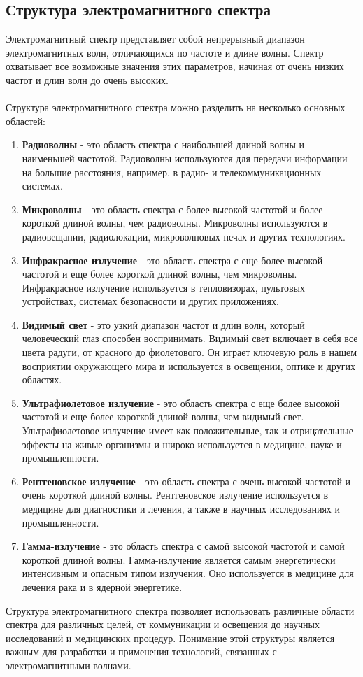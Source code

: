 \documentclass{article}
\begin{document}
\subsection{Структура электромагнитного спектра}
Электромагнитный спектр представляет собой непрерывный диапазон электромагнитных волн, отличающихся по частоте и длине волны. Спектр охватывает все возможные значения этих параметров, начиная от очень низких частот и длин волн до очень высоких.\\
~\\
Структура электромагнитного спектра можно разделить на несколько основных областей:
\begin{enumerate}
\item \textbf{Радиоволны} - это область спектра с наибольшей длиной волны и наименьшей частотой. Радиоволны используются для передачи информации на большие расстояния, например, в радио- и телекоммуникационных системах.
\item \textbf{Микроволны} - это область спектра с более высокой частотой и более короткой длиной волны, чем радиоволны. Микроволны используются в радиовещании, радиолокации, микроволновых печах и других технологиях.
\item \textbf{Инфракрасное излучение} - это область спектра с еще более высокой частотой и еще более короткой длиной волны, чем микроволны. Инфракрасное излучение используется в тепловизорах, пультовых устройствах, системах безопасности и других приложениях.
\item \textbf{Видимый свет} - это узкий диапазон частот и длин волн, который человеческий глаз способен воспринимать. Видимый свет включает в себя все цвета радуги, от красного до фиолетового. Он играет ключевую роль в нашем восприятии окружающего мира и используется в освещении, оптике и других областях.
\item \textbf{Ультрафиолетовое излучение} - это область спектра с еще более высокой частотой и еще более короткой длиной волны, чем видимый свет. Ультрафиолетовое излучение имеет как положительные, так и отрицательные эффекты на живые организмы и широко используется в медицине, науке и промышленности.
\item \textbf{Рентгеновское излучение} - это область спектра с очень высокой частотой и очень короткой длиной волны. Рентгеновское излучение используется в медицине для диагностики и лечения, а также в научных исследованиях и промышленности.
\item \textbf{Гамма-излучение} - это область спектра с самой высокой частотой и самой короткой длиной волны. Гамма-излучение является самым энергетически интенсивным и опасным типом излучения. Оно используется в медицине для лечения рака и в ядерной энергетике.
\end{enumerate}
Структура электромагнитного спектра позволяет использовать различные области спектра для различных целей, от коммуникации и освещения до научных исследований и медицинских процедур. Понимание этой структуры является важным для разработки и применения технологий, связанных с электромагнитными волнами.
\end{document}
